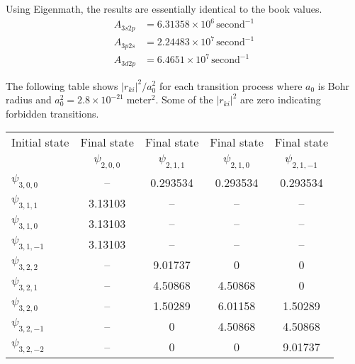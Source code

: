 Using Eigenmath,
the results are essentially identical to the book values.
\begin{align*}
A_{3s2p}&=6.31358\times10^6\,\text{second}^{-1}
\\
A_{3p2s}&=2.24483\times10^7\,\text{second}^{-1}
\\
A_{3d2p}&=6.4651\times10^7\,\text{second}^{-1}
\end{align*}



The following table shows $|r_{ki}|^2/a_0^2$ for each transition process
where $a_0$ is Bohr radius and $a_0^2=2.8\times10^{-21}\;\text{meter}^2$.
Some of the $|r_{ki}|^2$ are zero indicating forbidden transitions.

\begin{center}
\begin{tabular}{|l|c|c|c|c|}
\hline
Initial state & Final state & Final state & Final state & Final state
\\
& $\psi_{2,0,0}$ & $\psi_{2,1,1}$ & $\psi_{2,1,0}$ & $\psi_{2,1,-1}$
\\[1ex]
\hline
$\psi_{3,0,0}$ & -- & 0.293534 & 0.293534 & 0.293534
\\
\hline
$\psi_{3,1,1}$ & 3.13103 & -- & -- & --
\\
$\psi_{3,1,0}$ & 3.13103 & -- & -- & --
\\
$\psi_{3,1,-1}$ & 3.13103 & -- & -- & --
\\
\hline
$\psi_{3,2,2}$ & -- & 9.01737 & 0 & 0
\\
$\psi_{3,2,1}$ & -- & 4.50868 & 4.50868 & 0
\\
$\psi_{3,2,0}$ & -- & 1.50289 & 6.01158 & 1.50289
\\
$\psi_{3,2,-1}$ & -- & 0 & 4.50868 & 4.50868
\\
$\psi_{3,2,-2}$ & -- & 0 & 0 & 9.01737
\\
\hline
\end{tabular}
\end{center}


